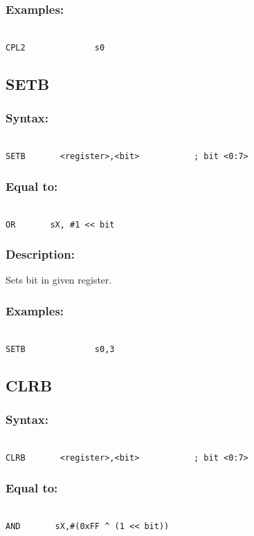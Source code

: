         \subsubsection{Examples:}
        {
            ~\\
            \usecodefont
            \verb'CPL2              s0'\\
        }

    \subsection{SETB}
        \subsubsection{Syntax:}
        {
            ~\\
            \usecodefont
            \verb'SETB       <register>,<bit>           ; bit <0:7>'
        }
        \subsubsection{Equal to:}
         {
            ~\\
            \usecodefont
            \verb'OR       sX, #1 << bit'
        }
        \subsubsection{Description:}
            Sets bit in given register.

        \subsubsection{Examples:}
        {
            ~\\
            \usecodefont
            \verb'SETB              s0,3'\\
        }

    \subsection{CLRB}
        \subsubsection{Syntax:}
        {
            ~\\
            \usecodefont
            \verb'CLRB       <register>,<bit>           ; bit <0:7>'
        }
        \subsubsection{Equal to:}
        {
            ~\\
            \usecodefont
            \verb'AND       sX,#(0xFF ^ (1 << bit))'
        }
